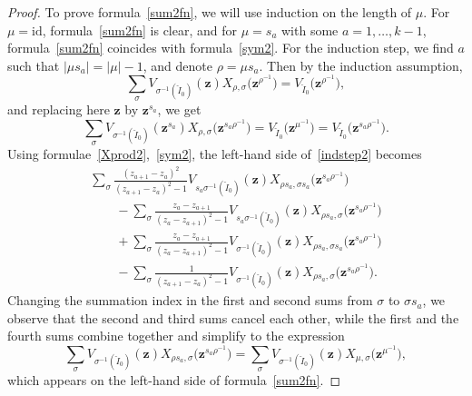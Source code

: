 \documentclass[pdftex]{sigma}
\numberwithin{equation}{section}
\newcommand{\id}{\mathrm{id}}
\begin{document}
\begin{proof}
To prove formula~\eqref{sum2fn}, we will use induction on the length of $\mu$. For $\mu=\id$, formula~\eqref{sum2fn} is clear, and for $\mu=s_a$ with some $a=1,\dots,k-1$, formula~\eqref{sum2fn} coincides with formula~\eqref{sym2}. For the induction step, we find $a$ such that $|\mu s_a|=|\mu|-1$, and denote $\rho=\mu s_a$. Then by the induction assumption,
\begin{equation*}
\sum_{\sigma} V_{\sigma^{-1}(\check{I}_0)}(\boldsymbol{z})X_{\rho,\sigma }\bigl(\boldsymbol{z}^{\rho^{-1}}\bigr) =V_{\check{I}_0}\bigl(\boldsymbol{z}^{\rho^{-1}}\bigr),
\end{equation*}
and replacing here $\boldsymbol{z}$ by $\boldsymbol{z}^{s_a}$, we get
\begin{equation}\label{indstep2}
\sum_{\sigma} V_{\sigma^{-1}(\check{I}_0)}(\boldsymbol{z}^{s_a})X_{\rho,\sigma }\bigl(\boldsymbol{z}^{s_a\rho^{-1}}\bigr)=V_{\check{I}_0}\bigl(\boldsymbol{z}^{\mu^{-1}}\bigr)= V_{\check{I}_0}\bigl(\boldsymbol{z}^{s_a\rho ^{-1}}\bigr).
\end{equation}
Using formulae~\eqref{Xprod2},~\eqref{sym2}, the left-hand side of~\eqref{indstep2} becomes
\begin{gather*}
\sum_{\sigma} \frac{(z_{a+1}-z_a)^2}{(z_{a+1}-z_{a})^2-1}V_{s_a\sigma^{-1}(\check{I}_0)}(\boldsymbol{z})X_{\rho s_a,\sigma s_a}\bigl(\boldsymbol{z}^{s_a\rho^{-1}}\bigr) \\
\qquad{}-\sum_{\sigma}\frac{z_a-z_{a+1}}{(z_a-z_{a+1})^2-1}V_{s_a\sigma^{-1}(\check{I}_0)}(\boldsymbol{z})X_{\rho s_a,\sigma }\bigl(\boldsymbol{z}^{s_a\rho^{-1}}\bigr)
\\
\qquad{}+\sum_{\sigma} \frac{z_a-z_{a+1}}{(z_a-z_{a+1})^2-1}V_{\sigma^{-1}(\check{I}_0)}(\boldsymbol{z})X_{\rho s_a,\sigma s_a}\bigl(\boldsymbol{z}^{s_a\rho^{-1}}\bigr) \\
\qquad{}-\sum_{\sigma} \frac{1}{(z_{a+1}-z_{a})^2-1}V_{\sigma^{-1}(\check{I}_0)}(\boldsymbol{z})X_{\rho s_a, \sigma }\bigl(\boldsymbol{z}^{s_a\rho^{-1}}\bigr).
\end{gather*}
Changing the summation index in the first and second sums from $\sigma$ to $\sigma s_a$, we observe that the second and third sums cancel each other, while the first and the fourth sums combine together and simplify to the expression
\begin{equation*}
\sum_{\sigma} V_{\sigma^{-1}(\check{I}_0)}(\boldsymbol{z})X_{\rho s_a,\sigma }\bigl(\boldsymbol{z}^{s_a\rho^{-1}}\bigr) =\sum_{\sigma} V_{\sigma^{-1}(\check{I}_0)}(\boldsymbol{z})X_{\mu,\sigma }\bigl(\boldsymbol{z}^{\mu^{-1}}\bigr),
\end{equation*}
which appears on the left-hand side of formula~\eqref{sum2fn}.
\end{proof}
\end{document}
